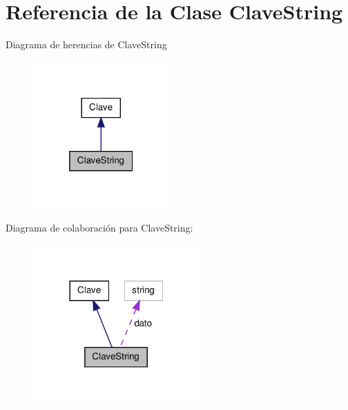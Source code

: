\hypertarget{class_clave_string}{\section{\-Referencia de la \-Clase \-Clave\-String}
\label{class_clave_string}
}


\-Diagrama de herencias de \-Clave\-String
\nopagebreak
\begin{figure}[H]
\begin{center}
\leavevmode
\includegraphics[width=148pt]{class_clave_string__inherit__graph}
\end{center}
\end{figure}


\-Diagrama de colaboración para \-Clave\-String\-:
\nopagebreak
\begin{figure}[H]
\begin{center}
\leavevmode
\includegraphics[width=180pt]{class_clave_string__coll__graph}
\end{center}
\end{figure}

